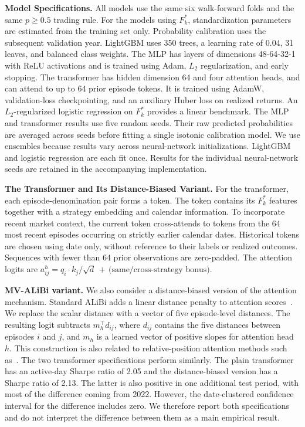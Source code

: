 \documentclass[sigconf,review,anonymous]{acmart}
\begin{document}
\smallskip\noindent\textbf{Model Specifications.}
All models use the same six walk-forward folds and the same $p\ge0.5$ trading rule. For the models using $F_k^\ast$, standardization parameters are estimated from the training set only. Probability calibration uses the subsequent validation year.
LightGBM uses 350 trees, a learning rate of 0.04, 31 leaves, and balanced class weights. The MLP has layers of dimensions 48-64-32-1 with ReLU activations and is trained using Adam, $L_2$ regularization, and early stopping. The transformer has hidden dimension 64 and four attention heads, and can attend to up to 64 prior episode tokens. It is trained using AdamW, validation-loss checkpointing, and an auxiliary Huber loss on realized returns. An $L_2$-regularized logistic regression on $F_k^\ast$ provides a linear benchmark.
The MLP and transformer results use five random seeds. Their raw predicted probabilities are averaged across seeds before fitting a single isotonic calibration model. We use ensembles because results vary across neural-network initializations. LightGBM and logistic regression are each fit once. Results for the individual neural-network seeds are retained in the accompanying implementation.

\smallskip\noindent\textbf{The Transformer and Its Distance-Biased Variant.}
\label{sec:transformer}
For the transformer, each episode-denomination pair forms a token. The token contains its $F_k^\ast$ features together with a strategy embedding and calendar information. To incorporate recent market context, the current token cross-attends to tokens from the 64 most recent episodes occurring on strictly earlier calendar dates. Historical tokens are chosen using date only, without reference to their labels or realized outcomes. Sequences with fewer than 64 prior observations are zero-padded. The attention logits are
$a^{h}_{ij}=q_i\!\cdot\!k_j/\sqrt{d}\,+\,\text{(same/cross-strategy bonus)}$.

\noindent\textbf{MV-ALiBi variant.}
We also consider a distance-biased version of the attention mechanism. Standard ALiBi adds a linear distance penalty to attention scores~\cite{press2022alibi}. We replace the scalar distance with a vector of five episode-level distances. The resulting logit subtracts $m_h^{\top}d_{ij}$, where $d_{ij}$ contains the five distances between episodes $i$ and $j$, and $m_h$ is a learned vector of positive slopes for attention head $h$. This construction is also related to relative-position attention methods such as~\cite{shaw2018self}.
The two transformer specifications perform similarly. The plain transformer has an active-day Sharpe ratio of 2.05 and the distance-biased version has a Sharpe ratio of 2.13. The latter is also positive in one additional test period, with most of the difference coming from 2022. However, the date-clustered confidence interval for the difference includes zero. We therefore report both specifications and do not interpret the difference between them as a main empirical result.
\end{document}
